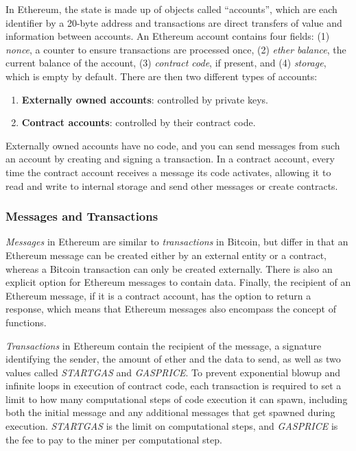 \documentclass[10pt,a4paper]{article}
\begin{document}
In Ethereum, the state is made up of objects called ``accounts'', which are each identifier by a 20-byte address and transactions are direct transfers of value and information between accounts. An Ethereum account contains four fields: (1) \textit{nonce}, a counter to ensure transactions are processed once, (2) \textit{ether balance}, the current balance of the account, (3) \textit{contract code}, if present, and (4) \textit{storage}, which is empty by default. There are then two different types of accounts:
\begin{enumerate}[(1)]
    \item \textbf{Externally owned accounts}: controlled by private keys.
    \item \textbf{Contract accounts}: controlled by their contract code.
\end{enumerate}
Externally owned accounts have no code, and you can send messages from such an account by creating and signing a transaction. In a contract account, every time the contract account receives a message its code activates, allowing it to read and write to internal storage and send other messages or create contracts.

\subsubsection*{Messages and Transactions}

\textit{Messages} in Ethereum are similar to \textit{transactions} in Bitcoin, but differ in that an Ethereum message can be created either by an external entity or a contract, whereas a Bitcoin transaction can only be created externally. There is also an explicit option for Ethereum messages to contain data. Finally, the recipient of an Ethereum message, if it is a contract account, has the option to return a response, which means that Ethereum messages also encompass the concept of functions.

\textit{Transactions} in Ethereum contain the recipient of the message, a signature identifying the sender, the amount of ether and the data to send, as well as two values called \textit{STARTGAS} and \textit{GASPRICE}. To prevent exponential blowup and infinite loops in execution of contract code, each transaction is required to set a limit to how many computational steps of code execution it can spawn, including both the initial message and any additional messages that get spawned during execution. \textit{STARTGAS} is the limit on computational steps, and \textit{GASPRICE} is the fee to pay to the miner per computational step. 
\end{document}
